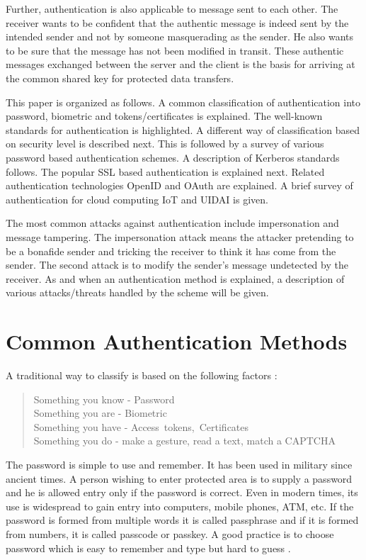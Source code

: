 \begin{multicols}{2}
Further, authentication is also applicable to message sent to each other. The receiver wants to be confident that the authentic message is indeed sent by the intended sender and not by someone masquerading as the sender. He also wants to be sure that the message has not been modified in transit. These authentic messages exchanged between the server and the client is the basis for arriving at the common shared key for protected data transfers.

This paper is organized as follows. A common classification of authentication into password, biometric and tokens/certificates is explained. The well-known standards for authentication is highlighted. A different way of classification based on security level is described next. This is followed by a survey of various password based authentication schemes. A description of Kerberos standards follows. The popular SSL based authentication is explained next. Related authentication technologies OpenID and OAuth are explained. A brief survey of authentication for cloud computing IoT and UIDAI is given.

The most common attacks against authentication include impersonation and message tampering. The impersonation attack means the attacker pretending to be a bonafide sender and tricking the receiver to think it has come from the sender. The second attack is to modify the sender's message undetected by the receiver. As and when an authentication method is explained, a description of various attacks/threats handled by the scheme will be given.\\[-15pt]

\section{Common Authentication Methods}

A traditional way to classify is based on the following factors \cite{chap2-key2}:
\begin{quote}
Something you know - Password\\
Something you are - Biometric\\
Something you have - \hbox{Access tokens, Certificates}\\
Something you do - make a gesture, read a text, match a CAPTCHA
\end{quote}

The password is simple to use and remember. It has been used in military since ancient times. A person wishing to enter protected area is to supply a password and he is allowed entry only if the password is correct. Even in modern times, its use is widespread to gain entry into computers, mobile phones, ATM, etc. If the password is formed from multiple words it is called passphrase and if it is formed from numbers, it is called passcode or passkey. A good practice is to choose password which is easy to remember and type but hard to guess \cite{chap2-key2}.


\end{multicols}
